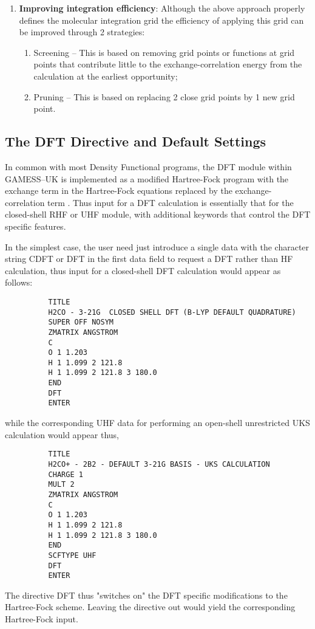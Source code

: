 \documentclass[11pt,fleqn]{article}
\begin{document}
\begin{enumerate}
\item {\bf Improving integration efficiency}:
Although the above approach properly defines the molecular integration grid
the efficiency of applying this grid can be improved through 2 strategies:
\begin{enumerate}
\item Screening -- This is based on removing grid points or functions
at grid points that contribute little to the exchange-correlation
energy from the calculation at the earliest opportunity;
\item Pruning -- This is based on replacing 2 close grid points by 1
new grid point.  
\end{enumerate}
\end{enumerate}


\subsection{The DFT Directive and Default Settings}

In common with most Density Functional programs, the DFT module within
GAMESS--UK is implemented as a modified Hartree-Fock program with the
exchange term in the Hartree-Fock equations replaced by the
exchange-correlation term \cite{hohen64}.  Thus input for a DFT calculation is
essentially that for the closed-shell RHF or UHF module, with
additional keywords that control the DFT specific features.

In the simplest case, the user need just introduce a single data
with the character string CDFT or DFT in the first data field to
request a DFT rather than HF calculation, thus input for a closed-shell
DFT calculation would appear as follows:

{
\footnotesize
\begin{verbatim}
          TITLE
          H2CO - 3-21G  CLOSED SHELL DFT (B-LYP DEFAULT QUADRATURE)
          SUPER OFF NOSYM
          ZMATRIX ANGSTROM
          C
          O 1 1.203
          H 1 1.099 2 121.8
          H 1 1.099 2 121.8 3 180.0
          END
          DFT
          ENTER
\end{verbatim}
}
while the corresponding UHF data for performing an open-shell
unrestricted UKS calculation would appear thus,

{
\footnotesize
\begin{verbatim}
          TITLE
          H2CO+ - 2B2 - DEFAULT 3-21G BASIS - UKS CALCULATION
          CHARGE 1
          MULT 2
          ZMATRIX ANGSTROM
          C
          O 1 1.203
          H 1 1.099 2 121.8
          H 1 1.099 2 121.8 3 180.0
          END
          SCFTYPE UHF
          DFT
          ENTER
\end{verbatim}
}
The directive DFT thus "switches on" the DFT specific modifications to
the Hartree-Fock scheme. Leaving the directive out would yield the
corresponding Hartree-Fock input.
\end{document}
